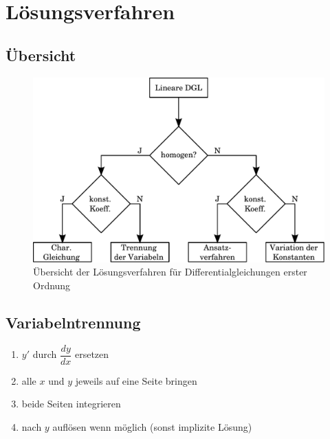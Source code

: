 \newpage
\section{Lösungsverfahren}

\subsection{Übersicht}
\begin{figure}[h!]
	\centering
	\includegraphics[width=1\textwidth]{diffgl_loes.pdf}
	\caption{Übersicht der Lösungsverfahren für Differentialgleichungen 
	erster Ordnung}
\end{figure}

\subsection{Variabelntrennung}
\begin{enumerate}
  \item $y'$ durch $\dfrac{dy}{dx}$ ersetzen
  \item alle $x$ und $y$ jeweils auf eine Seite bringen
  \item beide Seiten integrieren
  \item nach $y$ auflösen wenn möglich (sonst implizite Lösung)
\end{enumerate}

